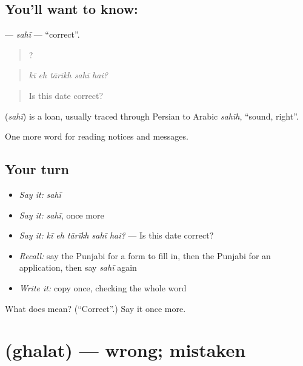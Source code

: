 \subsection*{You'll want to know: }
\textbf{} — \emph{sahī} — \textquotedblleft{}correct\textquotedblright{}.

\begin{quote}
    ?
\end{quote}

\begin{quote}
\emph{kī eh tārīkh sahī hai?}
\end{quote}

\begin{quote}
Is this date correct?
\end{quote}

\begin{cousinweb}
\textbf{} (\emph{sahī}) is a loan, usually traced through Persian to Arabic \emph{sahīh}, \textquotedblleft{}sound, right\textquotedblright{}.
\end{cousinweb}

\begin{grammarlens}[title={What you've built}]
One more word for reading notices and messages.
\end{grammarlens}

\subsection*{Your turn}
\begin{itemize}
\raggedright
  \item \emph{Say it:} \emph{sahī}
  \item \emph{Say it:} \emph{sahī}, once more
  \item \emph{Say it:} \emph{kī eh tārīkh sahī hai?} — Is this date correct?
  \item \emph{Recall:} say the Punjabi for a form to fill in, then the Punjabi for an application, then say \emph{sahī} again
  \item \emph{Write it:} copy \textbf{} once, checking the whole word
\end{itemize}

\begin{tcolorbox}[breakable,colback=teal!4,colframe=teal!35!black,title={Before you move on}]
What does  mean? (\textquotedblleft{}Correct\textquotedblright{}.) Say it once more.
\end{tcolorbox}
\section[\texorpdfstring{\pa{ਗ਼ਲਤ} (ghalat)}{ਗ਼ਲਤ (ghalat)}]{ (ghalat) — wrong; mistaken}

